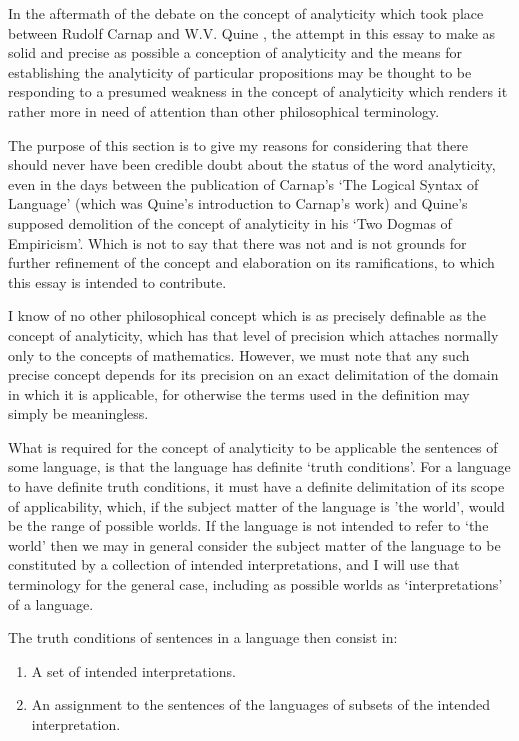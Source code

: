 \documentclass[10pt,titlepage]{article}
\begin{document}
In the aftermath of the debate on the concept of analyticity which took place between Rudolf Carnap and W.V. Quine \cite{carnap90}, the attempt in this essay to make as solid and precise as possible a conception of analyticity and the means for establishing the analyticity of particular propositions may be thought to be responding to a presumed weakness in the concept of analyticity which renders it rather more in need of attention than other philosophical terminology.

The purpose of this section is to give my reasons for considering that there should never have been credible doubt about the status of the word analyticity, even in the days between the publication of Carnap's `The Logical Syntax of Language' (which was Quine's introduction to Carnap's work) and Quine's supposed demolition of the concept of analyticity in his `Two Dogmas of Empiricism'.
Which is not to say that there was not and is not grounds for further refinement of the concept and elaboration on its ramifications, to which this essay is intended to contribute.

I know of no other philosophical concept which is as precisely definable as the concept of analyticity, which has that level of precision which attaches normally only to the concepts of mathematics.
However, we must note that any such precise concept depends for its precision on an exact delimitation of the domain in which it is applicable, for otherwise the terms used in the definition may simply be meaningless.

What is required for the concept of analyticity to be applicable the sentences of some language, is that the language has definite `truth conditions'.
For a language to have definite truth conditions, it must have a definite delimitation of its scope of applicability, which, if the subject matter of the language is 'the world', would be the range of possible worlds.
If the language is not intended to refer to `the world' then we may in general consider the subject matter of the language to be constituted by a collection of intended interpretations, and I will use that terminology for the general case, including as possible worlds as `interpretations' of a language.

The truth conditions of sentences in a language then consist in:

\begin{enumerate}
\item A set of intended interpretations.
  \item An assignment to the sentences of the languages of subsets of the intended interpretation.
\end{enumerate}
\end{document}
